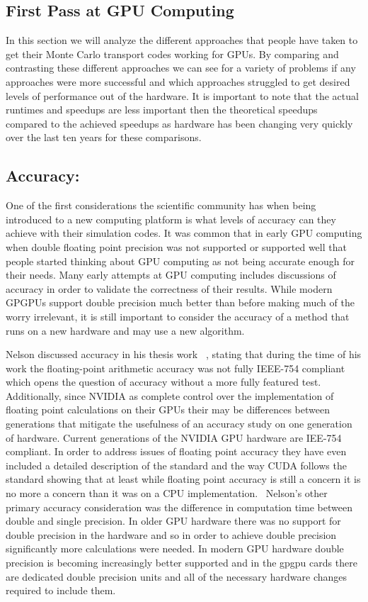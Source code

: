 \subsection{ \textbf{First Pass at GPU Computing}}

In this section we will analyze the different approaches that people have taken to get their Monte Carlo transport codes working for GPUs.
%
By comparing and contrasting these different approaches we can see for a variety of problems if any approaches were more successful and which approaches struggled to get desired levels of performance out of the hardware.
%
 It is important to note that the actual runtimes and speedups are less important then the theoretical speedups compared to the achieved speedups as hardware has been changing very quickly over the last ten years for these comparisons.

\subsection*{ Accuracy: }

One of the first considerations the scientific community has when being introduced to a new computing platform is what levels of accuracy can they achieve with their simulation codes.
%
It was common that in early GPU computing when double floating point precision was not supported or supported well that people started thinking about GPU computing as not being accurate enough for their needs.
%
Many early attempts at GPU computing includes discussions of accuracy in order to validate the correctness of their results.
%
While modern GPGPUs support double precision much better than before making much of the worry irrelevant, it is still important to consider the accuracy of a method that runs on a new hardware and may use a new algorithm.

%
Nelson discussed accuracy in his thesis work ~\cite{nelson2009monte}, stating that during the time of his work the floating-point arithmetic accuracy was not fully IEEE-754 compliant which opens the question of accuracy without a more fully featured test. Additionally, since NVIDIA as complete control over the implementation of floating point calculations on their GPUs their may be differences between generations that mitigate the usefulness of an accuracy study on one generation of hardware.
%
Current generations of the NVIDIA GPU hardware are IEE-754 compliant. 
%
In order to address issues of floating point accuracy they have even included a detailed description of the standard and the way CUDA follows the standard showing that at least while floating point accuracy is still a concern it is no more a concern than it was on a CPU implementation.~\cite{cudaToolkitv7.5}
%
Nelson's other primary accuracy consideration was the difference in computation time between double and single precision.
%
In older GPU hardware there was no support for double precision in the hardware and so in order to achieve double precision significantly more calculations were needed.
%
In modern GPU hardware double precision is becoming increasingly better supported and in the gpgpu cards there are dedicated double precision units and all of the necessary hardware changes required to include them.
%

